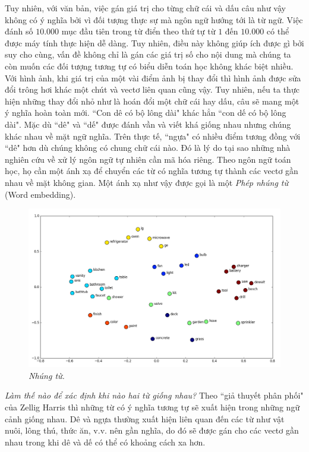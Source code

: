 \begin{multicols}{2}
	Tuy nhiên, với văn bản, việc gán giá trị cho từng chữ cái và dấu câu như vậy không có ý nghĩa bởi vì đối tượng thực sự mà ngôn ngữ hướng tới là từ ngữ. Việc đánh số $10.000$ mục đầu tiên trong từ điển theo thứ tự từ $1$ đến $10.000$ có thể được máy tính thực hiện dễ dàng. Tuy nhiên, điều này không giúp ích được gì bởi suy cho cùng, vấn đề không chỉ là gán các giá trị số cho nội dung mà chúng ta còn muốn các đối tượng tương tự có biểu diễn toán học không khác biệt nhiều. Với hình ảnh, khi giá trị của một vài điểm ảnh bị thay đổi thì hình ảnh được sửa đổi trông hơi khác một chút và vectơ liên quan cũng vậy. Tuy nhiên, nếu ta thực hiện những thay đổi nhỏ như là hoán đổi một chữ cái hay dấu, câu sẽ mang một ý nghĩa hoàn toàn mới. ``Con dê có bộ lông dài" khác hẳn ``con dế có bộ lông dài". Mặc dù ``dê" và ``dế" được đánh vần và viết khá giống nhau nhưng chúng khác nhau về mặt ngữ nghĩa. Trên thực tế, ``ngựa" có nhiều điểm tương đồng với ``dê" hơn dù chúng không có chung chữ cái nào.  Đó là lý do tại sao những nhà nghiên cứu về xử lý ngôn ngữ tự nhiên cần mã hóa riêng. Theo ngôn ngữ toán học, họ cần một ánh xạ để chuyển các từ có nghĩa tương tự thành các vectơ gần nhau về mặt không gian. Một ánh xạ như vậy được gọi là một \textit{Phép nhúng từ} (Word embedding).
	\begin{figure}[H]
		\vspace*{-5pt}
		\centering
		\captionsetup{labelformat= empty, justification=centering}
		\includegraphics[width= 1\linewidth]{Word-embeddings-model.png}
		\caption{\small\textit{\color{timhieukhoahoc}Nhúng từ.}}
		\vspace*{-10pt}
	\end{figure}
	\textit{Làm thế nào để xác định khi nào hai từ giống nhau?} Theo ``giả thuyết phân phối" của Zellig Harris thì những từ có ý nghĩa tương tự sẽ xuất hiện trong những ngữ cảnh giống nhau. Dê và ngựa thường xuất hiện liên quan đến các từ như vật nuôi, lông thú, thức ăn, v.v. nên gần nghĩa, do đó sẽ được gán cho các vectơ gần nhau trong khi dê và dế có thể có khoảng cách xa hơn. 

\end{multicols}
